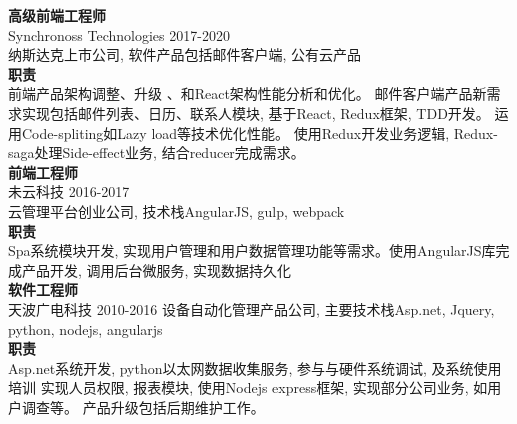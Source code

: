 \documentclass[a4paper,9pt]{extarticle}
\begin{document}
\noindent
\textbf{高级前端工程师} \\
Synchronoss Technologies 2017-2020 \\
纳斯达克上市公司, 软件产品包括邮件客户端, 公有云产品 \\
\textbf{职责} \\
前端产品架构调整、升级 、和React架构性能分析和优化。 邮件客户端产品新需求实现包括邮件列表、日历、联系人模块, 基于React, Redux框架, TDD开发。 运用Code-spliting如Lazy load等技术优化性能。 使用Redux开发业务逻辑, Redux-saga处理Side-effect业务, 结合reducer完成需求。\\

\noindent
\textbf{前端工程师} \\
未云科技 2016-2017  \\
云管理平台创业公司, 技术栈AngularJS, gulp, webpack\\
\textbf{职责} \\
Spa系统模块开发, 实现用户管理和用户数据管理功能等需求。使用AngularJS库完成产品开发, 调用后台微服务, 实现数据持久化 \\

\noindent
\textbf{软件工程师} \\
天波广电科技 2010-2016
设备自动化管理产品公司, 主要技术栈Asp.net, Jquery, python, nodejs, angularjs \\
\textbf{职责} \\
Asp.net系统开发, python以太网数据收集服务, 参与与硬件系统调试, 及系统使用培训 实现人员权限, 报表模块, 使用Nodejs express框架, 实现部分公司业务, 如用户调查等。 产品升级包括后期维护工作。


\end{document}
